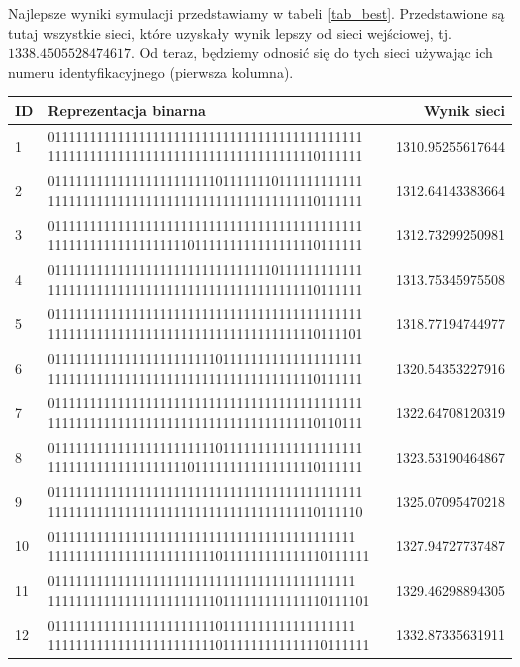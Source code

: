 \documentclass[twoside,12pt]{report}
\begin{document}
Najlepsze wyniki symulacji przedstawiamy w tabeli \ref{tab_best}. Przedstawione są tutaj wszystkie sieci, które uzyskały wynik lepszy od sieci wejściowej, tj. $1338.4505528474617$. Od teraz, będziemy odnosić się do tych sieci używając ich numeru identyfikacyjnego (pierwsza kolumna).

\begin{minipage}{\linewidth}
\label{tab_best} 
\begin{tabularx}{\linewidth}{ | l | X | r | }
	\hline
	ID & Reprezentacja binarna & Wynik sieci \\
	\hline
	1 & 011111111111111111111111111111111111111111111 	111111111111111111111111111111111111110111111 & 1310.95255617644 \\ \hline
	2 & 011111111111111111111111011111110111111111111 111111111111111111111111111111111111110111111 & 1312.64143383664 \\ \hline
	3 & 011111111111111111111111111111111111111111111 111111111111111111110111111111111111110111111 & 1312.73299250981 \\ \hline
	4 & 011111111111111111111111111111110111111111111 111111111111111111111111111111111111110111111 & 1313.75345975508 \\ \hline
	5 & 011111111111111111111111111111111111111111111 111111111111111111111111111111111111110111101 & 1318.77194744977 \\ \hline
	6 & 011111111111111111111111011111111111111111111 111111111111111111111111111111111111110111111 & 1320.54353227916 \\ \hline
	7 & 011111111111111111111111111111111111111111111 111111111111111111111111111111111111110110111 & 1322.64708120319 \\ \hline
	8 & 011111111111111111111111011111111111111111111 111111111111111111110111111111111111110111111 & 1323.53190464867 \\ \hline
	9 & 011111111111111111111111111111111111111111111 111111111111111111111111111111111111110111110 & 1325.07095470218 \\ \hline
	10 & 01111111111111111111111111111111111111111111 1111111111111111111111110111111111111110111111 & 1327.94727737487 \\ \hline
	11 & 01111111111111111111111111111111111111111111 1111111111111111111111110111111111111110111101 & 1329.46298894305 \\ \hline
	12 & 01111111111111111111111101111111111111111111 1111111111111111111111110111111111111110111111 & 1332.87335631911 \\ \hline

\end{tabularx}
\end{minipage}
\end{document}
